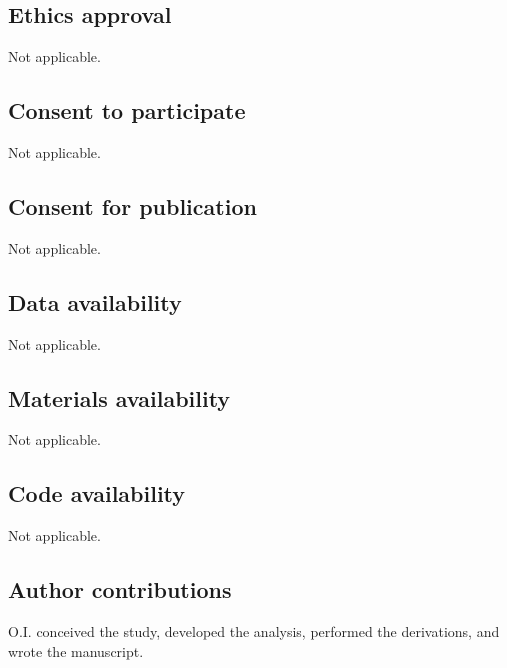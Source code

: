 \documentclass[pdflatex,sn-mathphys-num]{sn-jnl}
\begin{document}
        \subsection*{Ethics approval}
            Not applicable.

        \subsection*{Consent to participate}
            Not applicable.

        \subsection*{Consent for publication}
            Not applicable.

        \subsection*{Data availability}
            Not applicable.

        \subsection*{Materials availability}
            Not applicable.

        \subsection*{Code availability}
            Not applicable.

        \subsection*{Author contributions}
            O.I. conceived the study, developed the analysis, performed the derivations, and wrote the manuscript.
\end{document}
